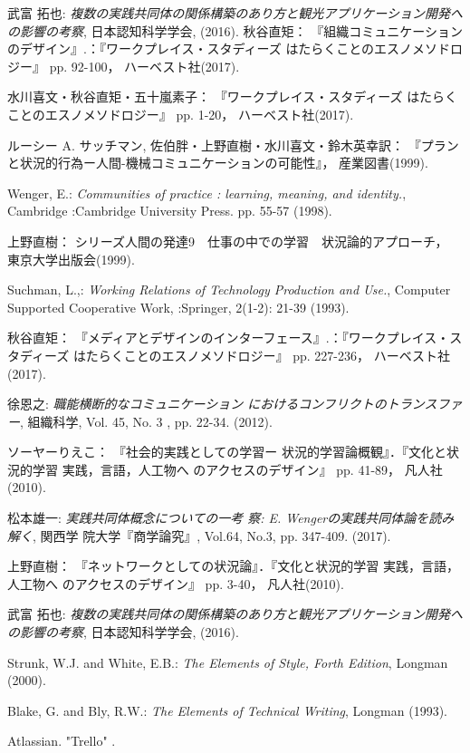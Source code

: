 \documentclass[submit,techrep]{ipsj}
\begin{document}
\begin{thebibliography}{9}


  武富 拓也: {\it 複数の実践共同体の関係構築のあり方と観光アプリケーション開発への影響の考察},
    日本認知科学学会,
    (2016). 
  秋谷直矩：
  『組織コミュニケーションのデザイン』.：『ワークプレイス・スタディーズ はたらくことのエスノメソドロジー』 pp. 92-100，
  ハーベスト社(2017).

  水川喜文・秋谷直矩・五十嵐素子：
  『ワークプレイス・スタディーズ はたらくことのエスノメソドロジー』 pp. 1-20，
  ハーベスト社(2017).

ルーシー A. サッチマン, 佐伯胖・上野直樹・水川喜文・鈴木英幸訳：
『プランと状況的行為ー人間-機械コミュニケーションの可能性』，
産業図書(1999).

Wenger, E.: {\it Communities of practice : learning,
meaning, and identity.},
Cambridge :Cambridge University
Press. pp. 55-57 (1998).

上野直樹：
シリーズ人間の発達9　仕事の中での学習　状況論的アプローチ，
東京大学出版会(1999).

Suchman, L.,: {\it Working Relations of Technology Production and Use.},
Computer Supported Cooperative Work, :Springer,
2(1-2): 21-39 (1993).

  秋谷直矩：
  『メディアとデザインのインターフェース』.：『ワークプレイス・スタディーズ はたらくことのエスノメソドロジー』 pp. 227-236，
  ハーベスト社(2017).

  徐恩之: {\it 職能横断的なコミュニケーション
  におけるコンフリクトのトランスファー},
  組織科学,
  Vol. 45, No. 3 , pp. 22-34. (2012).

  ソーヤーりえこ：
  『社会的実践としての学習ー 状況的学習論概観』．『文化と状況的学習 実践，言語，人工物へ のアクセスのデザイン』 pp. 41-89，
  凡人社(2010).

  松本雄一: {\it 実践共同体概念についての一考 察: E. Wengerの実践共同体論を読み解く},
  関西学 院大学『商学論究』,
  Vol.64, No.3, pp. 347-409. (2017).

上野直樹：
『ネットワークとしての状況論』．『文化と状況的学習 実践，言語，人工物へ のアクセスのデザイン』 pp. 3-40，
凡人社(2010).

武富 拓也: {\it 複数の実践共同体の関係構築のあり方と観光アプリケーション開発への影響の考察},
日本認知科学学会,
(2016).

Strunk, W.J. and White, E.B.: {\it The Elements of Style, Forth Edition},
Longman (2000).

Blake, G. and Bly, R.W.: {\it The Elements of Technical Writing},
Longman (1993).

Atlassian.
"Trello"
%
.


\end{thebibliography}
\end{document}
